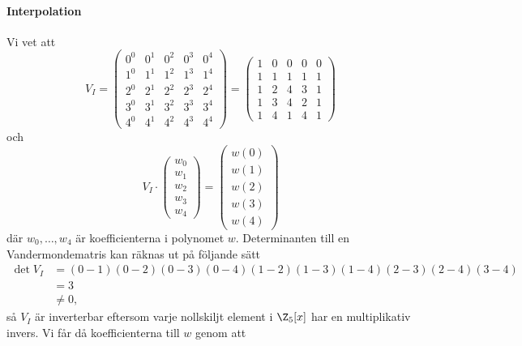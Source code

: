 \paragraph{Interpolation}
Vi vet att
\begin{equation*}
  V_I = \begin{pmatrix}
    0^0 & 0^1 & 0^2 & 0^3 & 0^4 \\
    1^0 & 1^1 & 1^2 & 1^3 & 1^4 \\
    2^0 & 2^1 & 2^2 & 2^3 & 2^4 \\
    3^0 & 3^1 & 3^2 & 3^3 & 3^4 \\
    4^0 & 4^1 & 4^2 & 4^3 & 4^4
  \end{pmatrix} =
  \begin{pmatrix}
    1 & 0 & 0 & 0 & 0 \\
    1 & 1 & 1 & 1 & 1 \\
    1 & 2 & 4 & 3 & 1 \\
    1 & 3 & 4 & 2 & 1 \\
    1 & 4 & 1 & 4 & 1
  \end{pmatrix}
\end{equation*}
och
\begin{equation*}
  V_I \cdot \begin{pmatrix}
    w_0 \\
    w_1 \\
    w_2 \\
    w_3 \\
    w_4
  \end{pmatrix} =
  \begin{pmatrix}
    w(0) \\
    w(1) \\
    w(2) \\
    w(3) \\
    w(4)
  \end{pmatrix}
\end{equation*}
där $w_0, \dots, w_4$ är koefficienterna i polynomet $w$. Determinanten till en
Vandermondematris kan räknas ut på följande sätt
\begin{align*}
 \det V_I &= (0-1)(0-2)(0-3)(0-4)(1-2)(1-3)(1-4)(2-3)(2-4)(3-4) \\
          &= 3  \\
          &\neq 0,
\end{align*}
så $V_I$ är inverterbar eftersom varje nollskiljt element i $\Z_5[x]$
har en multiplikativ invers. Vi får då koefficienterna till $w$ genom att

